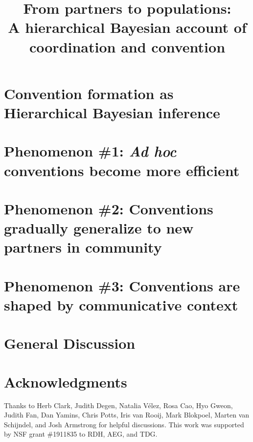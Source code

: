 \documentclass[10pt, jou, floatsintext]{apa7}
\title{From partners to populations: \\[.1em] A hierarchical Bayesian account of coordination and convention}
\begin{document}
\maketitle



\section{Convention formation as Hierarchical Bayesian inference}



\section{Phenomenon \#1:  \emph{Ad hoc} conventions become more efficient}



\section{Phenomenon \#2:  Conventions gradually generalize to new partners in community}



\section{Phenomenon \#3:  Conventions are shaped by communicative context}



\section{General Discussion}



\section{\bf Acknowledgments}
\small

Thanks to Herb Clark, Judith Degen, Natalia V\'elez, Rosa Cao, Hyo Gweon, Judith Fan, Dan Yamins, Chris Potts, Iris van Rooij, Mark Blokpoel, Marten van Schijndel, and Josh Armstrong for helpful discussions.
This work was supported by NSF grant \#1911835 to RDH, AEG, and TDG.





\renewcommand{\thefigure}{A\arabic{figure}}
\renewcommand{\thetable}{A\arabic{table}}
\setcounter{table}{0}
\setcounter{figure}{0}
\end{document}
